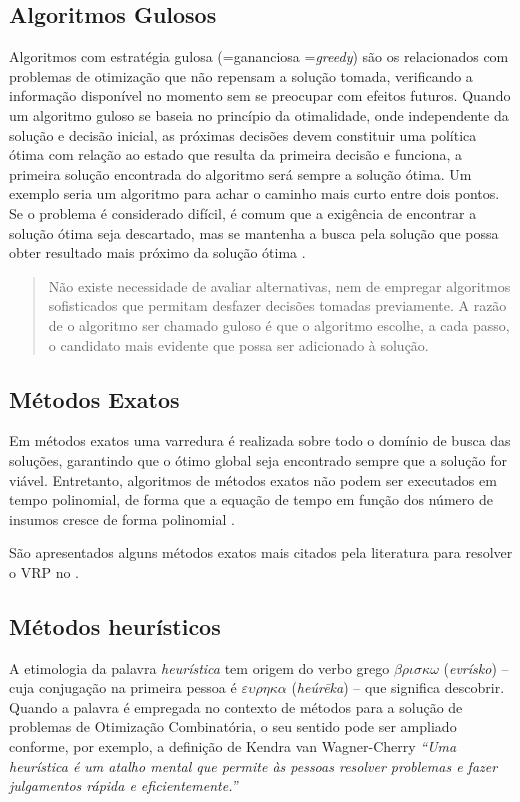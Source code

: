 \subsection{Algoritmos Gulosos}
\label{gulosos}
Algoritmos com estratégia gulosa (=gananciosa =\emph{greedy}) \cite{feofiloff} são os relacionados com problemas de otimização que não repensam a solução tomada, verificando a informação disponível no momento sem se preocupar com efeitos futuros. Quando um algoritmo guloso se baseia no princípio da otimalidade, onde independente da solução e decisão inicial, as próximas decisões devem constituir uma política ótima com relação ao estado que resulta da primeira decisão \cite[p. 77]{otimalidade} e funciona, a primeira solução encontrada do algoritmo será sempre a solução ótima. Um exemplo seria um algoritmo para achar o caminho mais curto entre dois pontos. Se o problema é considerado difícil, é comum que a exigência de encontrar a solução ótima seja descartado, mas se mantenha a busca pela solução que possa obter resultado mais próximo da solução ótima \cite[p. 60]{ziviani}.

\begin{quote}
Não existe necessidade de avaliar alternativas, nem de empregar algoritmos sofisticados que permitam desfazer decisões tomadas previamente. A razão de o algoritmo ser chamado guloso é que o algoritmo escolhe, a cada passo, o candidato mais evidente que possa ser adicionado à solução.
\end{quote}

\subsection{Métodos Exatos} \label{metodos-exatos}

Em métodos exatos uma varredura é realizada sobre todo o domínio de busca das soluções, garantindo que o ótimo global seja encontrado sempre que a solução for viável. Entretanto, algoritmos de métodos exatos não podem ser executados em tempo polinomial, de forma que a equação de tempo em função dos número de insumos cresce de forma polinomial \cite{maxwell}. 

São apresentados alguns métodos exatos mais citados pela literatura para resolver o VRP no .

\subsection{Métodos heurísticos}\label{heuristica}
A etimologia da palavra \emph{heurística} tem origem do verbo grego $\beta \rho \iota \sigma \kappa \omega$
(\emph{evrísko}) -- cuja conjugação na primeira pessoa é  $\varepsilon \upsilon \rho 	\eta \kappa \alpha$ (\emph{heúrēka}) -- que significa descobrir. Quando a palavra é empregada no contexto de métodos para a solução de problemas de Otimização Combinatória, o seu sentido pode ser ampliado conforme, por exemplo, a definição de Kendra van Wagner-Cherry \emph{``Uma heurística é um atalho mental que permite às pessoas resolver problemas e fazer julgamentos rápida e eficientemente.''} \cite{goldbarg}


